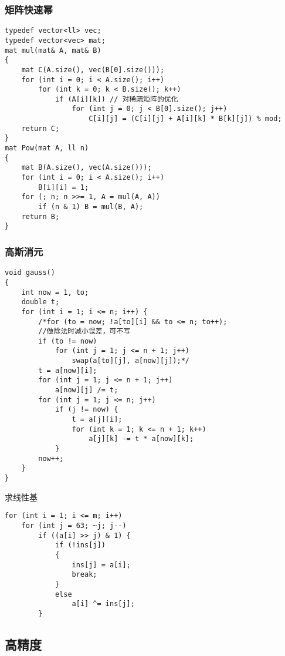 \documentclass[a4]{article}
\begin{document}
\subsubsection{矩阵快速幂}
\begin{lstlisting}
typedef vector<ll> vec;
typedef vector<vec> mat;
mat mul(mat& A, mat& B)
{
    mat C(A.size(), vec(B[0].size()));
    for (int i = 0; i < A.size(); i++)
        for (int k = 0; k < B.size(); k++)
            if (A[i][k]) // 对稀疏矩阵的优化
                for (int j = 0; j < B[0].size(); j++)
                    C[i][j] = (C[i][j] + A[i][k] * B[k][j]) % mod;
    return C;
}
mat Pow(mat A, ll n)
{
    mat B(A.size(), vec(A.size()));
    for (int i = 0; i < A.size(); i++)
        B[i][i] = 1;
    for (; n; n >>= 1, A = mul(A, A))
        if (n & 1) B = mul(B, A);
    return B;
}
\end{lstlisting}
\subsubsection{高斯消元}
\begin{lstlisting}
void gauss()
{
    int now = 1, to;
    double t;
    for (int i = 1; i <= n; i++) {
        /*for (to = now; !a[to][i] && to <= n; to++);
        //做除法时减小误差，可不写
        if (to != now)
            for (int j = 1; j <= n + 1; j++)
                swap(a[to][j], a[now][j]);*/
        t = a[now][i];
        for (int j = 1; j <= n + 1; j++)
            a[now][j] /= t;
        for (int j = 1; j <= n; j++)
            if (j != now) {
                t = a[j][i];
                for (int k = 1; k <= n + 1; k++)
                    a[j][k] -= t * a[now][k];
            }
        now++;
    }
}

\end{lstlisting}
求线性基
\begin{lstlisting}
for (int i = 1; i <= m; i++)
    for (int j = 63; ~j; j--)
        if ((a[i] >> j) & 1) {
            if (!ins[j])
            {
                ins[j] = a[i];
                break;
            }
            else
                a[i] ^= ins[j];
        }
\end{lstlisting}
\subsection{高精度}
\end{document}
